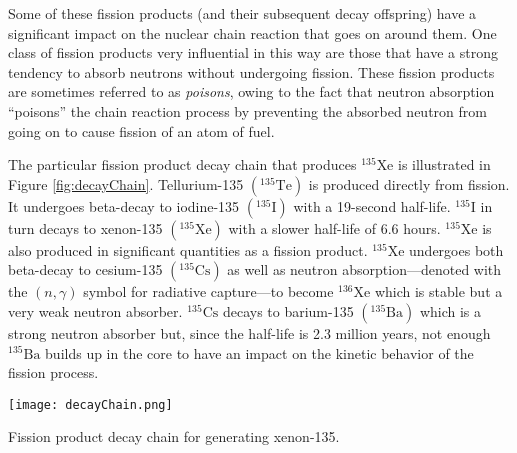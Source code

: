 Some of these fission products (and their subsequent decay offspring) have a significant impact on the nuclear chain reaction that goes on around them.  One class of fission products very influential in this way are those that have a strong tendency to absorb neutrons without undergoing fission.  These fission products are sometimes referred to as \emph{poisons}, owing to the fact that neutron absorption ``poisons'' the chain reaction process by preventing the absorbed neutron from going on to cause fission of an atom of fuel.


The particular fission product decay chain that produces $^{135}$Xe is illustrated in Figure \ref{fig:decayChain}.  Tellurium-135 $\left(^{135}\text{Te}\right)$ is produced directly from fission.  It undergoes beta-decay to iodine-135 $\left(^{135}\text{I}\right)$ with a 19-second half-life.  $^{135}\text{I}$ in turn decays to xenon-135 $\left(^{135}\text{Xe}\right)$ with a slower half-life of 6.6 hours. $^{135}\text{Xe}$ is also produced in significant quantities as a fission product. $^{135}\text{Xe}$ undergoes both beta-decay to cesium-135 $\left(^{135}\text{Cs}\right)$ as well as neutron absorption---denoted with the $(n,\gamma)$ symbol for radiative capture---to become $^{136}\text{Xe}$ which is stable but a very weak neutron absorber.  $^{135}\text{Cs}$ decays to barium-135 $\left(^{135}\text{Ba}\right)$ which is a strong neutron absorber but, since the half-life is 2.3 million years, not enough $^{135}\text{Ba}$ builds up in the core to have an impact on the kinetic behavior of the fission process.
\begin{marginfigure}[-4.0cm]
\texttt{[image: decayChain.png]}
\caption{Fission product decay chain for generating xenon-135.}
\label{fig:decayChain}
\end{marginfigure}

